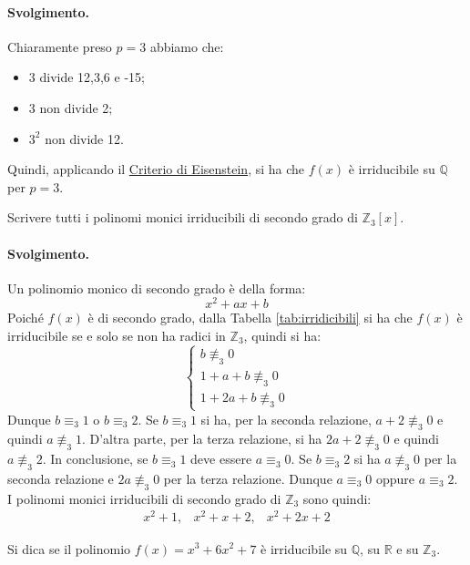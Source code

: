 \paragraph{Svolgimento.} Chiaramente preso $p=3$ abbiamo che:
\begin{itemize}
	\item 3 divide 12,3,6 e -15;
	\item 3 non divide 2;
	\item $3^{2}$ non divide 12.
\end{itemize}
Quindi, applicando il \hyperlink{thm:eisenstein}{Criterio di Eisenstein}, si ha che $f(x)$ è irriducibile su $\mathbb{Q}$ per $p=3$.\hfill \blacksquare
\begin{exsbox}
	Scrivere tutti i polinomi monici irriducibili di secondo grado di $\mathbb{Z}_{3}[x]$.
\end{exsbox}
\paragraph{Svolgimento.} Un polinomio monico di secondo grado è della forma:
\[x^{2}+ax+b\]
Poiché $f(x)$ è di secondo grado, dalla Tabella \ref{tab:irridicibili} si ha che $f(x)$ è irriducibile se e solo se non ha radici in $\mathbb{Z}_{3}$, quindi si ha:
\begin{displaymath}
	\begin{cases}
		b \nequiv_{3} 0 \\
		1+a+b \nequiv_{3} 0\\
		1+2a+b \nequiv_{3} 0
	\end{cases}
\end{displaymath}
Dunque $b \equiv_{3} 1$ o $b \equiv_{3} 2$. Se $b \equiv_{3} 1 $ si ha, per la seconda relazione, $a+2 \nequiv_{3} 0$ e quindi $a \nequiv_{3} 1$. D'altra parte, per la terza relazione, si ha $2a+2 \nequiv_{3} 0$ e quindi $a \nequiv_{3} 2$. In conclusione, se $b \equiv_{3} 1$ deve essere $a \equiv_{3} 0$. Se $b \equiv_{3} 2$ si ha $a \nequiv_{3} 0$ per la seconda relazione e $2a \nequiv_{3} 0$ per la terza relazione. Dunque $a \equiv_{3} 0$ oppure $a \equiv_{3} 2$. I polinomi monici irriducibili di secondo grado di $\mathbb{Z}_{3}$ sono quindi:
\[
\begin{array}{lll}
	x^{2}+1, & x^{2}+x+2, & x^{2}+2x+2
\end{array}
\]
\hfill \blacksquare
\begin{exsbox}
	Si dica se il polinomio $f(x)=x^{3}+6x^{2}+7$ è irriducibile su $\mathbb{Q}$, su $\mathbb{R}$ e su $\mathbb{Z}_{3}$.
\end{exsbox}
